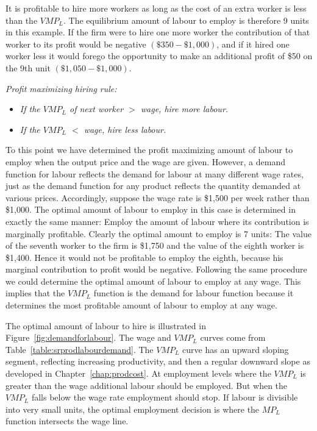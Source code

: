 It is profitable to hire more workers as long as the cost of an extra worker
is less than the $VMP_{L}$. The equilibrium amount of labour to employ is
therefore 9 units in this example. If the firm were to hire one more worker
the contribution of that worker to its profit would be negative 
$(\$350-\$1,000)$, and if it hired one worker less it would forego the
opportunity to make an additional profit of \$50 on the 9th unit 
$(\$1,050-\$1,000)$.


\textit{Profit maximizing hiring rule:}
\begin{itemize}
\item \textit{If the $VMP_L$ of next worker $>$ wage, hire more labour.}

\item \textit{If the $VMP_L$ $<$ wage, hire less labour.}
\end{itemize}

To this point we have determined the profit maximizing amount of labour to
employ when the output price and the wage are given. However, a demand
function for labour reflects the demand for labour at many different wage
rates, just as the demand function for any product reflects the quantity demanded at
various prices. Accordingly, suppose the wage rate is \$1,500 per week
rather than \$1,000. The optimal amount of labour to employ in this case is
determined in exactly the same manner: Employ the amount of labour where its
contribution is marginally profitable. Clearly the optimal amount to employ
is 7 units: The value of the seventh worker to the firm is \$1,750 and the
value of the eighth worker is \$1,400. Hence it would not be profitable to
employ the eighth, because his marginal contribution to profit would be
negative. Following the same procedure we could determine the optimal amount
of labour to employ at any wage. This implies that the $VMP_{L}$ function is
the demand for labour function because it determines the most profitable
amount of labour to employ at any wage.

\newhtmlpage

The optimal amount of labour to hire is illustrated in Figure~\ref{fig:demandforlabour}.
The wage and $VMP_L$ curves come from Table~\ref{table:srprodlabourdemand}.
The $VMP_L$ curve has an upward sloping segment,
reflecting increasing productivity, and then a regular downward slope as
developed in Chapter~\ref{chap:prodcost}. At employment levels where the 
$VMP_L$ is greater than the wage additional labour should be employed. But
when the $VMP_L$ falls below the wage rate employment should stop. If labour
is divisible into very small units, the optimal employment decision is where
the $MP_L$ function intersects the wage line.

